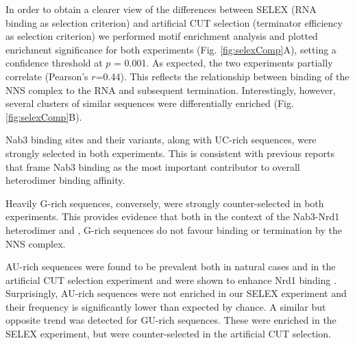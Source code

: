 In order to obtain a clearer view of the differences between \invitro{} SELEX (RNA binding as selection criterion) and artificial CUT selection (terminator efficiency as selection criterion) we performed motif enrichment analysis and plotted enrichment significance for both experiments (Fig. \ref{fig:selexComp}A), setting a confidence threshold at $p$ = 0.001. As expected, the two experiments partially correlate (Pearson's $r$=0.44). This reflects the relationship between binding of the NNS complex to the RNA and subsequent termination. Interestingly, however, several clusters of similar sequences were differentially enriched (Fig. \ref{fig:selexComp}B). 

Nab3 binding sites and their variants, along with UC-rich sequences, were strongly selected in both experiments. This is consistent with previous reports that frame Nab3 binding as the most important contributor to overall heterodimer binding affinity.

Heavily G-rich sequences, conversely, were strongly counter-selected in both experiments. This provides evidence that both in the context of the Nab3-Nrd1 heterodimer and \invivo{}, G-rich sequences do not favour binding  or termination by the NNS complex.

AU-rich sequences were found to be prevalent both in natural cases and in the artificial CUT selection experiment and were shown to enhance Nrd1 binding \cite{porrua:2012:in}. Surprisingly, AU-rich sequences were not enriched in our SELEX experiment and their frequency is significantly lower than expected by chance. A similar but opposite trend was detected for GU-rich sequences. These were enriched in the SELEX experiment, but were counter-selected in the artificial CUT selection. 

